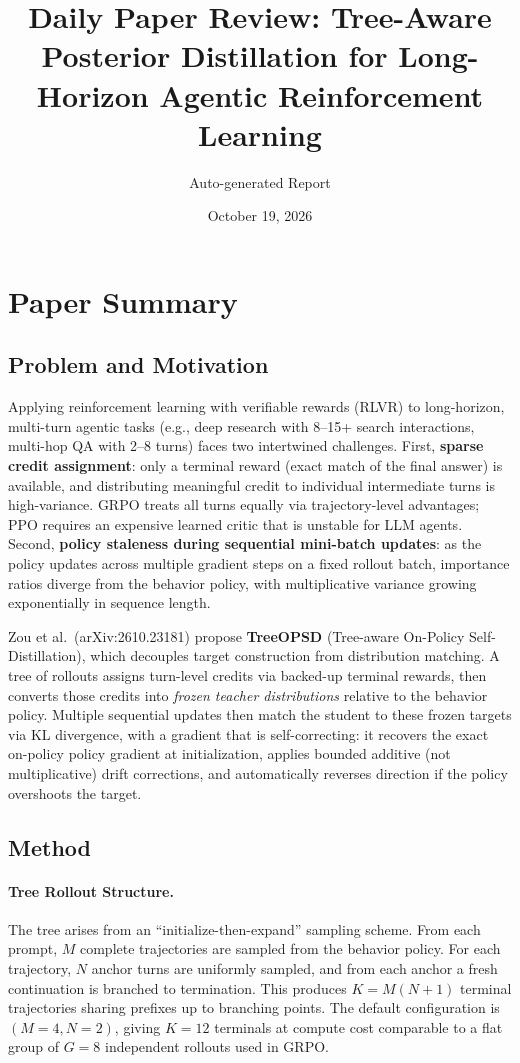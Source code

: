 \documentclass[11pt,a4paper]{article}
\title{Daily Paper Review: Tree-Aware Posterior Distillation for Long-Horizon Agentic Reinforcement Learning}
\author{Auto-generated Report}
\date{October 19, 2026}
\begin{document}
\maketitle

\section{Paper Summary}

\subsection{Problem and Motivation}
Applying reinforcement learning with verifiable rewards (RLVR) to long-horizon, multi-turn agentic tasks (e.g., deep research with 8--15+ search interactions, multi-hop QA with 2--8 turns) faces two intertwined challenges. First, \textbf{sparse credit assignment}: only a terminal reward (exact match of the final answer) is available, and distributing meaningful credit to individual intermediate turns is high-variance. GRPO treats all turns equally via trajectory-level advantages; PPO requires an expensive learned critic that is unstable for LLM agents. Second, \textbf{policy staleness during sequential mini-batch updates}: as the policy updates across multiple gradient steps on a fixed rollout batch, importance ratios diverge from the behavior policy, with multiplicative variance growing exponentially in sequence length.

Zou et al.\ (arXiv:2610.23181) propose \textbf{TreeOPSD} (Tree-aware On-Policy Self-Distillation), which decouples target construction from distribution matching. A tree of rollouts assigns turn-level credits via backed-up terminal rewards, then converts those credits into \emph{frozen teacher distributions} relative to the behavior policy. Multiple sequential updates then match the student to these frozen targets via KL divergence, with a gradient that is self-correcting: it recovers the exact on-policy policy gradient at initialization, applies bounded additive (not multiplicative) drift corrections, and automatically reverses direction if the policy overshoots the target.

\subsection{Method}

\paragraph{Tree Rollout Structure.}
The tree arises from an ``initialize-then-expand'' sampling scheme. From each prompt, $M$ complete trajectories are sampled from the behavior policy. For each trajectory, $N$ anchor turns are uniformly sampled, and from each anchor a fresh continuation is branched to termination. This produces $K = M(N{+}1)$ terminal trajectories sharing prefixes up to branching points. The default configuration is $(M{=}4, N{=}2)$, giving $K{=}12$ terminals at compute cost comparable to a flat group of $G{=}8$ independent rollouts used in GRPO.
\end{document}
